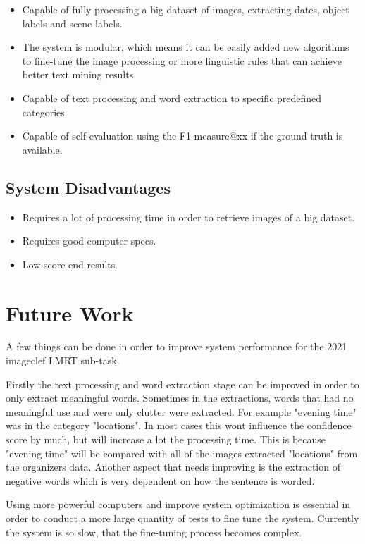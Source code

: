 \begin{itemize}
    \itemsep0em
    \item Capable of fully processing a big dataset of images, extracting dates, object labels and scene labels.
    \item The system is modular, which means it can be easily added new algorithms to fine-tune the image processing or more linguistic rules that can achieve better text mining results.
    \item Capable of text processing and word extraction to specific predefined categories.
    \item Capable of self-evaluation using the F1-measure@xx if the ground truth is available.
\end{itemize}


\subsection{System Disadvantages}

\begin{itemize}
    \itemsep0em
    \item Requires a lot of processing time in order to retrieve images of a big dataset.
    \item Requires good computer specs.
    \item Low-score end results.
\end{itemize}

\section{Future Work}

A few things can be done in order to improve system performance for the 2021 imageclef LMRT sub-task.

Firstly the text processing and word extraction stage can be improved in order to only extract meaningful words. Sometimes in the extractions, words that had no meaningful use and were only clutter were extracted. For example "evening time" was in the category "locations". In most cases this wont influence the confidence score by much, but will increase a lot the processing time. This is because "evening time" will be compared with all of the images extracted "locations" from the organizers data. Another aspect that needs improving is the extraction of negative words which is very dependent on how the sentence is worded.

Using more powerful computers and improve system optimization is essential in order to conduct a more large quantity of tests to fine tune the system. Currently the system is so slow, that the fine-tuning process becomes complex.


